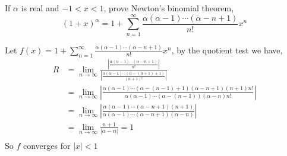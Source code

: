 \documentclass{article}
\begin{document}
If $\alpha$ is real and $-1 <x < 1$, prove Newton's binomial theorem,
\[(1+x)^{\alpha} = 1+\sum_{n=1}^\infty \frac{\alpha(\alpha
    -1)\cdots(\alpha-n+1)}{n!} x^n\]


Let $f(x) = 1+\sum_{n=1}^\infty \frac{\alpha(\alpha
  -1)\cdots(\alpha-n+1)}{n!} x^n$, by the quotient test we have,
\begin{align*}
  R&= \lim_{n \rightarrow \infty} \frac{\left|  \frac{\alpha(\alpha
      -1)\cdots(\alpha-n+1)}{n!}\right|}{\left|\frac{\alpha(\alpha
     -1)\cdots(\alpha-(n+1)+1)}{(n+1)!}\right|}\\
   &= \lim_{n \rightarrow \infty} \left|\frac{\alpha(\alpha
      -1)\cdots(\alpha -(n-1)+1)(\alpha-n+1)(n+1)n!}{\alpha(\alpha
  -1)\cdots(\alpha -(n-1))(\alpha-n)n!}\right|\\
   &= \lim_{n \rightarrow \infty} \left|\frac{\alpha(\alpha
      -1)\cdots(\alpha-n+1)(n+1)}{\alpha(\alpha
     -1)\cdots(\alpha -n +1)(\alpha-n)}\right|\\
  &= \lim_{n \rightarrow \infty} \frac{n+1}{\left|\alpha-n\right|} = 1\\
\end{align*}
So $f$ converges for $|x|<1$
\end{document}
